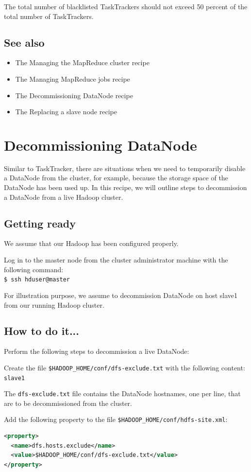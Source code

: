 The total number of blacklisted TaskTrackers should not exceed 50 percent of the total number of TaskTrackers.
\subsection*{See also}
\begin{itemize}
  \item The Managing the MapReduce cluster recipe
  \item The Managing MapReduce jobs recipe
  \item The Decommissioning DataNode recipe
  \item The Replacing a slave node recipe
\end{itemize}

\section{Decommissioning DataNode}
Similar to TaskTracker, there are situations when we need to temporarily disable a DataNode from the cluster, for example, because the storage space of the DataNode has been used up. In this recipe, we will outline steps to decommission a DataNode from a live Hadoop cluster.
\subsection*{Getting ready}
We assume that our Hadoop has been configured properly.

Log in to the master node from the cluster administrator machine with the following command: \\
\verb|$ ssh hduser@master|

For illustration purpose, we assume to decommission DataNode on host slave1 from our running Hadoop cluster.
\subsection*{How to do it...}
Perform the following steps to decommission a live DataNode:

Create the file \verb|$HADOOP_HOME/conf/dfs-exclude.txt| with the following content:\\
\verb|slave1|

The \verb|dfs-exclude.txt| file contains the DataNode hostnames, one per line, that are to be decommissioned from the cluster.

Add the following property to the file \verb|$HADOOP_HOME/conf/hdfs-site.xml|:
\lstset{style=bashstyle}
\begin{lstlisting}[language=XML]
<property>
  <name>dfs.hosts.exclude</name>
  <value>$HADOOP_HOME/conf/dfs-exclude.txt</value>
</property>
\end{lstlisting}

